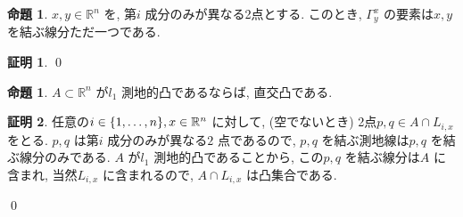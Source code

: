 \documentclass[10pt, fleqn, label-section=none]{bxjsarticle}
\theoremstyle{definition}
\newtheorem{prop}[dfn]{命題}
\newtheorem*{pf*}{証明}
\newcommand{\cbra}[1]{\mleft\{#1\mright\}}
\renewcommand{\;}{\, ; \,}
\begin{document}
\begin{prop}$x, y \in \mathbb R^n$ を, 第$i$ 成分のみが異なる2点とする. このとき, $\Gamma^x_y$ の要素は$x, y$ を結ぶ線分ただ一つである. 

\end{prop}
\begin{pf*}

\qed
\end{pf*}


\begin{prop}$A \subset \mathbb R^n$ が$l_1$ 測地的凸であるならば, 直交凸である. 

\end{prop}
\begin{pf*}任意の$i \in \cbra{1, \ldots, n}, x \in \mathbb R^n$ に対して, (空でないとき) 2点$p, q \in A \cap L_{i,x}$ をとる. $p, q$ は第$i$ 成分のみが異なる$2$ 点であるので, $p, q$ を結ぶ測地線は$p, q$ を結ぶ線分のみである. $A$ が$l_1$ 測地的凸であることから, この$p, q$ を結ぶ線分は$A$ に含まれ, 当然$L_{i, x}$ に含まれるので, $A \cap L_{i,x}$ は凸集合である. 

\qed
\end{pf*}
\end{document}
